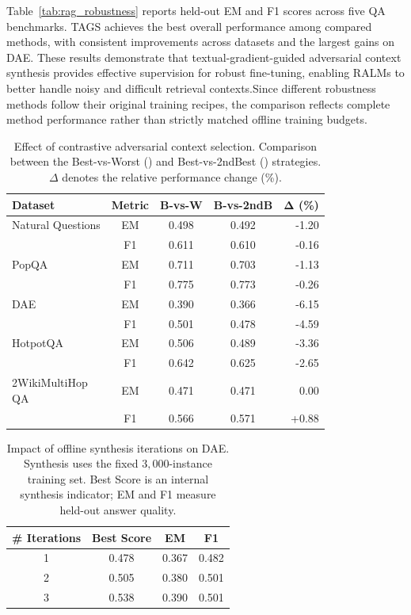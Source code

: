 \documentclass[11pt]{article}
\begin{document}
Table~\ref{tab:rag_robustness} reports held-out EM and F1 scores across five QA benchmarks. 
TAGS achieves the best overall performance among compared methods, with consistent improvements across datasets and the largest gains on DAE.
These results demonstrate that textual-gradient-guided adversarial context synthesis provides effective supervision for robust fine-tuning, enabling RALMs to better handle noisy and difficult retrieval contexts.Since different robustness methods follow their original training recipes, the comparison reflects complete method performance rather than strictly matched offline training budgets.
\begin{table}[t]
  \caption{Effect of contrastive adversarial context selection. Comparison between the Best-vs-Worst () and Best-vs-2ndBest () strategies. $\Delta$ denotes the relative performance change (\%).}
  \label{tab:contrastive_ablation}
  \centering
  \small
  \setlength{\tabcolsep}{4pt}
  \renewcommand{\arraystretch}{1.1}
  \begin{tabular}{@{}p{2.3cm} c c c r@{}}
  \toprule
  \textbf{Dataset} & \textbf{Metric} & \textbf{B-vs-W} & \textbf{B-vs-2ndB} & $\mathbf{\Delta}$ \textbf{(\%)} \\
  \midrule
  Natural Questions
   & EM & 0.498 & 0.492 & -1.20 \\
   & F1 & 0.611 & 0.610 & -0.16 \\
  \midrule
  PopQA
   & EM & 0.711 & 0.703 & -1.13 \\
   & F1 & 0.775 & 0.773 & -0.26 \\
  \midrule
  DAE
   & EM & 0.390 & 0.366 & -6.15 \\
   & F1 & 0.501 & 0.478 & -4.59 \\
  \midrule
  HotpotQA
   & EM & 0.506 & 0.489 & -3.36 \\
   & F1 & 0.642 & 0.625 & -2.65 \\
  \midrule
  \shortstack[l]{2WikiMultiHop\\QA}
   & EM & 0.471 & 0.471 & 0.00 \\
   & F1 & 0.566 & 0.571 & +0.88 \\
  \bottomrule
  \end{tabular}
\end{table}

\begin{table}[htbp]
  \caption{Impact of offline synthesis iterations on DAE. Synthesis uses the fixed $3,000$-instance training set. Best Score is an internal synthesis indicator; EM and F1 measure held-out answer quality.}
  \label{tab:iteration_analysis}
  \centering
  \setlength{\tabcolsep}{5pt}
  \renewcommand{\arraystretch}{1.08}
  \begin{tabular}{@{}c c c c@{}}
  \toprule
  \textbf{\# Iterations} & \textbf{Best Score} & \textbf{EM} & \textbf{F1} \\
  \midrule
  1 & 0.478 & 0.367 & 0.482 \\
  2 & 0.505 & 0.380 & 0.501 \\
  3 & 0.538 & 0.390 & 0.501 \\
  \bottomrule
  \end{tabular}
\end{table}
\end{document}
